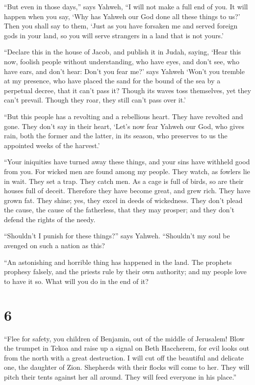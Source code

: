  ``But even in those days,'' says Yahweh, ``I will not make
a full end of you.  It will happen when you say, `Why has
Yahweh our God done all these things to us?' Then you shall say to them,
`Just as you have forsaken me and served foreign gods in your land, so
you will serve strangers in a land that is not yours.'

 ``Declare this in the house of Jacob, and publish it in
Judah, saying,  `Hear this now, foolish people without
understanding, who have eyes, and don't see, who have ears, and don't
hear:  Don't you fear me?' says Yahweh `Won't you tremble
at my presence, who have placed the sand for the bound of the sea by a
perpetual decree, that it can't pass it? Though its waves toss
themselves, yet they can't prevail. Though they roar, they still can't
pass over it.'

 ``But this people has a revolting and a rebellious heart.
They have revolted and gone.  They don't say in their
heart, `Let's now fear Yahweh our God, who gives rain, both the former
and the latter, in its season, who preserves to us the appointed weeks
of the harvest.'

 ``Your iniquities have turned away these things, and your
sins have withheld good from you.  For wicked men are found
among my people. They watch, as fowlers lie in wait. They set a trap.
They catch men.  As a cage is full of birds, so are their
houses full of deceit. Therefore they have become great, and grew rich.
 They have grown fat. They shine; yes, they excel in deeds
of wickedness. They don't plead the cause, the cause of the fatherless,
that they may prosper; and they don't defend the rights of the needy.

 ``Shouldn't I punish for these things?'' says Yahweh.
``Shouldn't my soul be avenged on such a nation as this?

 ``An astonishing and horrible thing has happened in the
land.  The prophets prophesy falsely, and the priests rule
by their own authority; and my people love to have it so. What will you
do in the end of it?

\hypertarget{section-5}{%
\section{6}\label{section-5}}

 ``Flee for safety, you children of Benjamin, out of the
middle of Jerusalem! Blow the trumpet in Tekoa and raise up a signal on
Beth Haccherem, for evil looks out from the north with a great
destruction.  I will cut off the beautiful and delicate one,
the daughter of Zion.  Shepherds with their flocks will come
to her. They will pitch their tents against her all around. They will
feed everyone in his place.''

